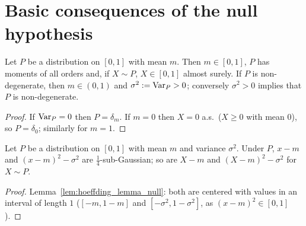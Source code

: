 \section{Basic consequences of the null hypothesis}

\begin{lemma}
  \label{lem:null_basic}
  \leanok
  Let $P$ be a distribution on $[0,1]$ with mean $m$. Then $m \in [0,1]$, $P$ has moments of all
  orders and, if $X \sim P$, $X \in [0,1]$ almost surely. If $P$ is non-degenerate, then
  $m \in (0, 1)$ and $\sigma^2 := \operatorname{Var}_P > 0$; conversely $\sigma^2 > 0$ implies that $P$ is
  non-degenerate.
\end{lemma}

\begin{proof}
  \leanok
  If $\operatorname{Var}_P = 0$ then $P = \delta_m$. If $m = 0$ then $X = 0$ a.s.\ ($X \ge 0$ with mean $0$), so
  $P = \delta_0$; similarly for $m = 1$.
\end{proof}

\begin{lemma}
  \label{lem:null_subgaussian}
  \leanok
  Let $P$ be a distribution on $[0,1]$ with mean $m$ and variance $\sigma^2$. Under $P$, $x - m$ and
  $(x - m)^2 - \sigma^2$ are $\frac14$-sub-Gaussian; so are $X - m$ and $(X - m)^2 - \sigma^2$ for
  $X \sim P$.
\end{lemma}

\begin{proof}
  \leanok
  Lemma~\ref{lem:hoeffding_lemma_null}: both are centered with values in an interval of length $1$
  ($[-m, 1-m]$ and $[-\sigma^2, 1 - \sigma^2]$, as $(x - m)^2 \in [0, 1]$).
\end{proof}
